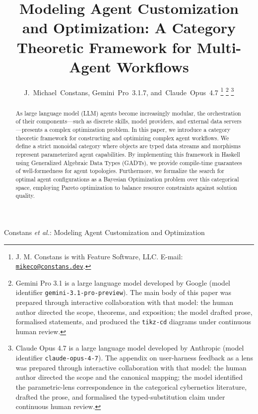 \documentclass[journal]{IEEEtran}
\begin{document}
\title{Modeling Agent Customization and Optimization: A Category Theoretic Framework for Multi-Agent Workflows}

\author{%
  J.~Michael~Constans,
  Gemini~Pro~3.1.7,
  and~Claude~Opus~4.7%
  \thanks{J. M. Constans is with Feature Software, LLC. E-mail:
  \href{mailto:mikeco@constans.dev}{\texttt{mikeco@constans.dev}}.}%
  \thanks{Gemini Pro 3.1 is a large language model developed by
  Google (model identifier \texttt{gemini-3.1-pro-preview}). The main
  body of this paper was prepared through interactive collaboration
  with that model: the human author directed the scope, theorems,
  and exposition; the model drafted prose, formalised statements, and
  produced the \texttt{tikz-cd} diagrams under continuous human
  review.}%
  \thanks{Claude Opus 4.7 is a large language model developed by
  Anthropic (model identifier \texttt{claude-opus-4-7}). The appendix
  on user-harness feedback as a lens was prepared through interactive
  collaboration with that model: the human author directed the scope
  and the canonical mapping; the model identified the parametric-lens
  correspondence in the categorical cybernetics literature, drafted
  the prose, and formalised the typed-substitution claim under
  continuous human review.}%
}

%
{Constans \MakeLowercase{\textit{et al.}}: Modeling Agent Customization and Optimization}

\maketitle

\begin{abstract}
As large language model (LLM) agents become increasingly modular, the orchestration of their components---such as discrete skills, model providers, and external data servers---presents a complex optimization problem. In this paper, we introduce a category theoretic framework for constructing and optimizing complex agent workflows. We define a strict monoidal category where objects are typed data streams and morphisms represent parameterized agent capabilities. By implementing this framework in Haskell using Generalized Algebraic Data Types (GADTs), we provide compile-time guarantees of well-formedness for agent topologies. Furthermore, we formalize the search for optimal agent configurations as a Bayesian Optimization problem over this categorical space, employing Pareto optimization to balance resource constraints against solution quality.
\end{abstract}
\end{document}
